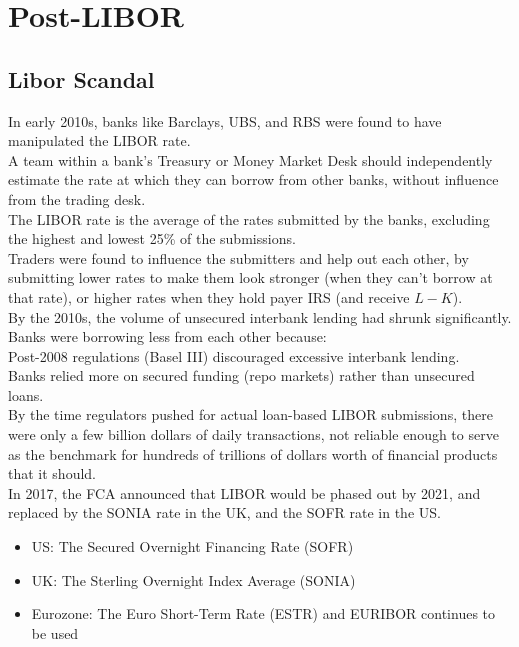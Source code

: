 \section{Post-LIBOR}
\subsection{Libor Scandal}
In early 2010s, banks like Barclays, UBS, and RBS were found to have manipulated the LIBOR rate.\\
A team within a bank's Treasury or Money Market Desk should independently estimate the rate
at which they can borrow from other banks, without influence from the trading desk.\\
The LIBOR rate is the average of the rates submitted by the banks, 
excluding the highest and lowest 25\% of the submissions.\\
Traders were found to influence the submitters and help out each other,
by submitting lower rates to make them look stronger (when they can't borrow at that rate),
or higher rates when they hold payer IRS (and receive $L - K$).\\

By the 2010s, the volume of unsecured interbank lending had shrunk significantly.
Banks were borrowing less from each other because:\\
Post-2008 regulations (Basel III) discouraged excessive interbank lending.\\
Banks relied more on secured funding (repo markets) rather than unsecured loans.\\
By the time regulators pushed for actual loan-based LIBOR submissions, 
there were only a few billion dollars of daily transactions,
not reliable enough to serve as the benchmark
for hundreds of trillions of dollars worth of financial products that it should.\\

In 2017, the FCA announced that LIBOR would be phased out by 2021,
and replaced by the SONIA rate in the UK, and the SOFR rate in the US.

\begin{itemize}
    \item US: The Secured Overnight Financing Rate (SOFR) 
    \item UK: The Sterling Overnight Index Average (SONIA)
    \item Eurozone: The Euro Short-Term Rate (ESTR) and EURIBOR continues to be used
\end{itemize}


